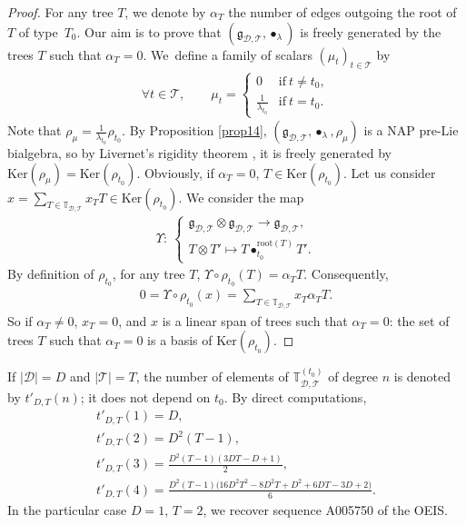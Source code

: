 \documentclass[10pt,a4paper]{amsart}
\numberwithin{equation}{section}
\newcommand{\T}{\mathcal{T}}
\newcommand{\D}{\mathcal{D}}
\newcommand{\g}{\mathfrak{g}}
\newcommand{\bfT}{\mathbb{T}}
\renewcommand{\ker}{\mathrm{Ker}}
\begin{document}
\begin{proof} For any tree $T$, we denote by $\alpha_T$ the number of edges outgoing the root of $T$ of type~$T_0$.
Our aim is to prove that $(\g_{\D,\T},\bullet_\lambda)$ is freely generated by the trees $T$ such that $\alpha_T=0$.
We~define a family of scalars $(\mu_t)_{t\in \T}$ by
\begin{align*}
\forall t\in \T,\qquad \mu_t=\begin{cases}
0&\mbox{if}\ t\neq t_0,\\
\displaystyle \frac{1}{\lambda_{t_0}}& \mbox{if}\ t=t_0.
\end{cases}\end{align*}
Note that $ \rho_\mu=\frac{1}{\lambda_{t_0}} \rho_{t_0}$.
By Proposition \ref{prop14}, $(\g_{\D,\T},\bullet_\lambda,\rho_\mu)$ is a NAP pre-Lie bialgebra,
so by Livernet's rigidity theorem \cite{Livernet}, it is freely generated by $\ker(\rho_\mu)=\ker(\rho_{t_0})$.
Obviously, if $\alpha_T=0$, $T\in \ker(\rho_{t_0})$.
Let us consider $ x=\sum_{T\in \bfT_{\D,\T}} x_T T\in \ker(\rho_{t_0})$. We consider the map
\begin{gather*}
\Upsilon\colon\ \begin{cases}
\g_{\D,\T}\otimes \g_{\D,\T} \longrightarrow \g_{\D,\T},
\\
T\otimes T' \longmapsto T\bullet_{t_0}^{\mathrm{root}(T)}T'.
\end{cases}
\end{gather*}
By definition of $\rho_{t_0}$, for any tree $T$, $\Upsilon \circ \rho_{t_0}(T)=\alpha_T T$. Consequently,
\begin{gather*}
0=\Upsilon \circ \rho_{t_0}(x)=\sum_{T\in \bfT_{\D,\T}} x_T\alpha_TT.
\end{gather*}
So if $\alpha_T\neq 0$, $x_T=0$, and $x$ is a linear span of trees such that $\alpha_T=0$:
the set of trees $T$ such that $\alpha_T=0$ is a basis of $\ker(\rho_{t_0})$.
\end{proof}

If $|\D|=D$ and $|\T|=T$, the number of elements of $\bfT_{\D,\T}^{(t_0)}$
of degree $n$ is denoted by $t'_{D,T}(n)$;
it does not depend on $t_0$. By direct computations,
\begin{gather*}
t'_{D,T}(1)=D,
\\
t'_{D,T}(2)=D^2(T-1),
\\
t'_{D,T}(3)=\frac{D^2(T-1)(3DT-D+1)}{2},
\\
t'_{D,T}(4)=\frac{D^2(T-1)\big(16D^2T^2-8D^2T+D^2+6DT-3D+2\big)}{6}.
\end{gather*}
In the particular case $D=1$, $T=2$, we recover sequence A005750 of the OEIS.
\end{document}
